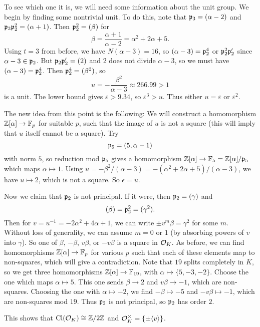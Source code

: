 \begin{example}
  To see which one it is, we will need some
  information about the unit group. We begin
  by finding some nontrivial unit.
  To do this, note that $\mathfrak{p}_3 = (\alpha - 2)$ and
  $\mathfrak{p}_3 \mathfrak{p}_2^2 = (\alpha + 1)$. Then $\mathfrak{p}_2^2 = (\beta)$
  for
  \[
    \beta = \frac{\alpha + 1}{\alpha - 2} = \alpha^2 + 2\alpha + 5.
  \]
  Using $t = 3$ from before, we have
  $N(\alpha - 3) = 16$, so $(\alpha - 3) = \mathfrak{p}_2^4$ or
  $\mathfrak{p}_2^2 \mathfrak{p}_2'$ since $\alpha - 3 \in \mathfrak{p}_2$.
  But $\mathfrak{p}_2 \mathfrak{p}_2' = (2)$ and $2$ does not divide
  $\alpha - 3$, so we must have $(\alpha - 3) = \mathfrak{p}_2^4$.
  Then $\mathfrak{p}_2^4 = (\beta^2)$, so
  \[
    u = -\frac{\beta^2}{\alpha - 3} \approx 266.99 > 1
  \]
  is a unit. The lower bound gives
  $\varepsilon > 9.34$, so $\varepsilon^3 > u$.
  Thus either $u = \varepsilon$ or $\varepsilon^2$.

  The new idea from this point is the following:
  We will construct a homomorphism
  $\mathbb{Z}[\alpha] \to \mathbb{F}_p$ for suitable $p$, such that
  the image of $u$ is not a square (this will imply
  that $u$ itself cannot be a square). Try
  \[
    \mathfrak{p}_5 = (5, \alpha - 1)
  \]
  with norm $5$, so reduction
  mod $\mathfrak{p}_5$ gives a homomorphism
  $\mathbb{Z}[\alpha] \to \mathbb{F}_5 = \mathbb{Z}[\alpha] / \mathfrak{p}_5$ which
  maps $\alpha \mapsto 1$. Using
  $u = -\beta^2 / (\alpha - 3) = -(\alpha^2 + 2\alpha + 5) / (\alpha - 3)$,
  we have $u \mapsto 2$, which is not a
  square.
  So $\epsilon = u$.

  Now we claim that $\mathfrak{p}_2$ is not principal.
  If it were, then $\mathfrak{p}_2 = (\gamma)$ and
  \[
    (\beta) = \mathfrak{p}_2^2 = (\gamma^2).
  \]
  Then for $v = u^{-1} = -2\alpha^2 + 4\alpha + 1$,
  we can write $\pm v^m \beta = \gamma^2$ for some
  $m$. Without loss of generality, we can assume
  $m = 0$ or $1$ (by absorbing powers of $v$ into
  $\gamma$). So one of $\beta$, $-\beta$, $v\beta$, or
  $-v\beta$ is a square in $\mathcal{O}_K$.
  As before, we can find homomorphisms $\mathbb{Z}[\alpha] \to \mathbb{F}_p$ for various
  $p$ such that each of these elements map to
  non-squares, which
  will give a contradiction. Note that $19$ splits
  completely in $K$, so we get three homomorphisms
  $\mathbb{Z}[\alpha] \to \mathbb{F}_{19}$, with $\alpha \mapsto \{5, -3, -2\}$.
  Choose the one which maps $\alpha \mapsto 5$.
  This one sends $\beta \to 2$ and $v\beta \to -1$,
  which are non-squares. Choosing the one
  with $\alpha \mapsto -2$, we find
  $-\beta \mapsto -5$ and $-v\beta \mapsto -1$,
  which are non-squares mod $19$. Thus
  $\mathfrak{p}_2$ is not principal, so $\mathfrak{p}_2$ has order $2$.

  This shows that $\operatorname{Cl}(\mathcal{O}_K) \cong \mathbb{Z} / 2\mathbb{Z}$
  and $\mathcal{O}_K^\times = \{\pm \langle v \rangle\}$.
\end{example}
